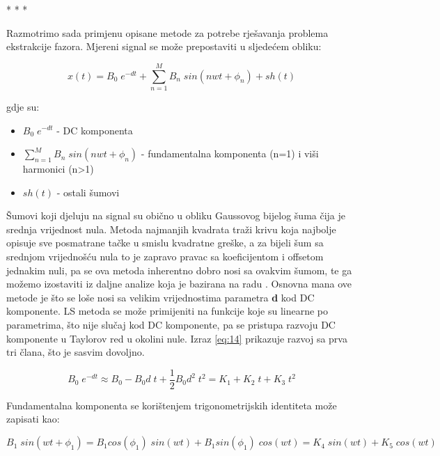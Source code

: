 \vspace{0.5cm}
\begin{center}
    * * *
\end{center}

\vspace{0.5cm}

Razmotrimo sada primjenu opisane metode za potrebe rješavanja problema ekstrakcije fazora. Mjereni signal se može prepostaviti u sljedećem obliku:

\begin{equation}
    x(t) = B_0\;e^{-dt} + \sum_{n=1}^{M} B_n\;sin(nwt+\phi_n) + sh(t)  
    \label{eq:13}
\end{equation}

gdje su:

\begin{itemize}
    \item $B_0\;e^{-dt}$ - DC komponenta
    \item $\sum_{n=1}^{M} B_n\;sin(nwt+\phi_n)$ - fundamentalna komponenta (n=1) i viši harmonici (n>1) 
    \item $sh(t)$ -  ostali šumovi
\end{itemize}

Šumovi koji djeluju na signal su obično u obliku Gaussovog bijelog šuma čija je srednja vrijednost nula. Metoda najmanjih kvadrata traži krivu koja najbolje opisuje sve posmatrane tačke u smislu kvadratne greške, a za bijeli šum sa srednjom vrijednošću nula to je zapravo pravac sa koeficijentom i offsetom jednakim nuli, pa se ova metoda inherentno dobro nosi sa ovakvim šumom, te ga možemo izostaviti iz daljne analize koja je bazirana na radu \cite{LSmetoda}. Osnovna mana ove metode je što se loše nosi sa velikim vrijednostima parametra \textbf{d} kod DC komponente. LS metoda se može primijeniti na funkcije koje su linearne po parametrima, što nije slučaj kod DC komponente, pa se pristupa razvoju DC komponente u Taylorov red u okolini nule. Izraz \ref{eq:14} prikazuje razvoj sa prva tri člana, što je sasvim dovoljno. 

\begin{equation}
    B_0\;e^{-dt} \approx B_0 - B_0 d\;t + \frac{1}{2} B_0 d^2\;t^2 = K_1 + K_2\;t + K_3\;t^2 
    \label{eq:14}
\end{equation}

Fundamentalna komponenta se korištenjem trigonometrijskih identiteta može zapisati kao:

\begin{equation}
    B_1\;sin(wt+\phi_1) = B_1cos(\phi_1)\;sin(wt) + B_1sin(\phi_1)\;cos(wt) = K_4\;sin(wt) + K_5\;cos(wt)
    \label{eq:15}
\end{equation}

